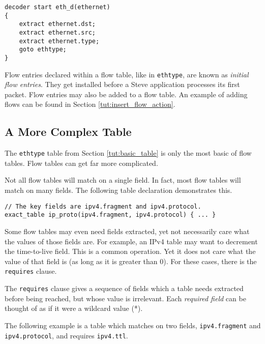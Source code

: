 \begin{codepage}
\begin{lstlisting}
decoder start eth_d(ethernet)
{
	extract ethernet.dst;
	extract ethernet.src;
	extract ethernet.type;
	goto ethtype;
}
\end{lstlisting}
\end{codepage}

Flow entries declared within a flow table, like in \texttt{ethtype}, are known
as \textit{initial flow entries}. They get installed before a Steve application
processes its first packet. Flow entries may also be added to a flow table. An
example of adding flows can be found in Section \ref{tut:insert_flow_action}.

\subsection{A More Complex Table} \label{tut:complex_table}

The \texttt{ethtype} table from Section \ref{tut:basic_table} is only the most basic of flow tables. Flow tables can get
far more complicated.

Not all flow tables will match on a single field. In fact, most flow tables will
match on many fields. The following table declaration demonstrates this.

\begin{codepage}
\begin{lstlisting}
// The key fields are ipv4.fragment and ipv4.protocol.
exact_table ip_proto(ipv4.fragment, ipv4.protocol) { ... }
\end{lstlisting}
\end{codepage}

Some flow tables may even need fields extracted, yet not
necessarily care what the values of those fields are. For example, an IPv4 table
may want to decrement the time-to-live field. This is a common operation. Yet it
does not care what the value of that field is (as long as it is greater than 0).
For these cases, there is the \texttt{requires} clause.

The \texttt{requires} clause gives a sequence of fields which a table needs
extracted before being reached, but whose value is irrelevant. Each
\textit{required field} can be thought of as if it were a wildcard value (*).

The following example is a table which matches on two fields,
\texttt{ipv4.fragment} and \texttt{ipv4.protocol}, and requires
\texttt{ipv4.ttl}.

